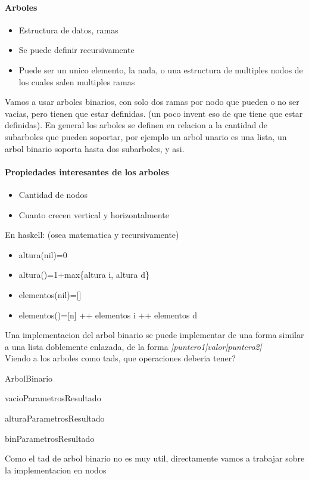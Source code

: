 \documentclass[a4paper,10pt]{article}
\begin{document}
\paragraph*{Arboles}
\begin{itemize}
    \item Estructura de datos, ramas
    \item Se puede definir recursivamente
    \item Puede ser un unico elemento, la nada, o una estructura de multiples nodos de los cuales salen multiples ramas
\end{itemize}
Vamos a usar arboles binarios, con solo dos ramas por nodo que pueden o no ser vacias, pero tienen que estar definidas.
(un poco invent eso de que tiene que estar definidas).
\salto{\baselineskip}
En general los arboles se definen en relacion a la cantidad de subarboles que pueden soportar, por ejemplo un arbol unario es una lista, un arbol binario soporta hasta dos subarboles, y asi.
\paragraph*{Propiedades interesantes de los arboles}
\begin{itemize}
    \item Cantidad de nodos
    \item Cuanto crecen vertical y horizontalmente
\end{itemize}
En haskell: (osea matematica y recursivamente)
\begin{itemize}
    \item altura(nil)=0
    \item altura()=1+max\{altura i, altura d\}
    \item elementos(nil)=[]
    \item elementos()=[n] ++ elementos i ++ elementos d
\end{itemize}
Una implementacion del arbol binario se puede implementar de una forma similar a una lista doblemente enlazada, de la forma \emph{|puntero1|valor|puntero2|}\\
Viendo a los arboles como tads, que operaciones deberia tener?
\begin{tad}{ArbolBinario}
    \obs{}{}
    \begin{proc}{vacio}{Parametros}{Resultado}
    \end{proc}
    \begin{proc}{altura}{Parametros}{Resultado}
    \end{proc}
    \begin{proc}{bin}{Parametros}{Resultado}
    \end{proc}
    Como el tad de arbol binario no es muy util, directamente vamos a trabajar sobre la implementacion en nodos
\end{tad}
\end{document}
